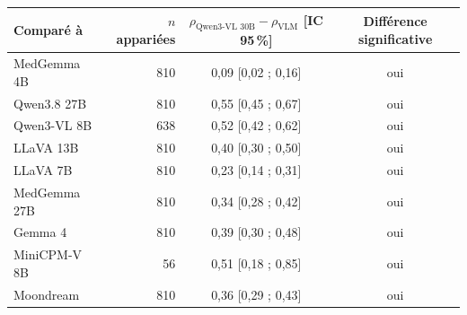\begin{tabular}{lrcc}
\toprule
Comparé à & $n$ appariées & $\rho_\text{Qwen3-VL 30B} - \rho_\text{VLM}$ [IC 95\,\%] & Différence significative \\
\midrule
MedGemma 4B & 810 & 0,09 [0,02 ; 0,16] & oui \\
Qwen3.8 27B & 810 & 0,55 [0,45 ; 0,67] & oui \\
Qwen3-VL 8B & 638 & 0,52 [0,42 ; 0,62] & oui \\
LLaVA 13B & 810 & 0,40 [0,30 ; 0,50] & oui \\
LLaVA 7B & 810 & 0,23 [0,14 ; 0,31] & oui \\
MedGemma 27B & 810 & 0,34 [0,28 ; 0,42] & oui \\
Gemma 4 & 810 & 0,39 [0,30 ; 0,48] & oui \\
MiniCPM-V 8B & 56 & 0,51 [0,18 ; 0,85] & oui \\
Moondream & 810 & 0,36 [0,29 ; 0,43] & oui \\
\bottomrule
\end{tabular}

